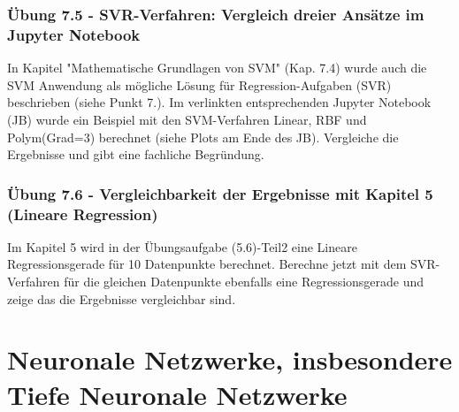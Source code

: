 \documentclass[12pt]{article}
\begin{document}
\subsubsection{Übung 7.5 - SVR-Verfahren: Vergleich dreier Ansätze im Jupyter Notebook} 
%
In Kapitel "Mathematische Grundlagen von SVM" (Kap. 7.4) wurde auch die SVM Anwendung als mögliche Lösung für Regression-Aufgaben (SVR) beschrieben (siehe Punkt 7.). Im verlinkten entsprechenden Jupyter Notebook (JB) wurde ein Beispiel mit den SVM-Verfahren Linear, RBF und Polym(Grad=3) berechnet (siehe Plots am Ende des JB). Vergleiche die Ergebnisse und gibt eine fachliche Begründung.

\subsubsection{Übung 7.6 - Vergleichbarkeit der Ergebnisse mit Kapitel 5 (Lineare Regression)} 
%
Im Kapitel 5 wird in der Übungsaufgabe (5.6)-Teil2  eine Lineare Regressionsgerade für 10 Datenpunkte berechnet. Berechne jetzt mit dem SVR-Verfahren für die gleichen Datenpunkte ebenfalls eine Regressionsgerade und zeige das die Ergebnisse vergleichbar sind.
\newpage

\section{Neuronale Netzwerke, insbesondere Tiefe Neuronale Netzwerke }
\end{document}
